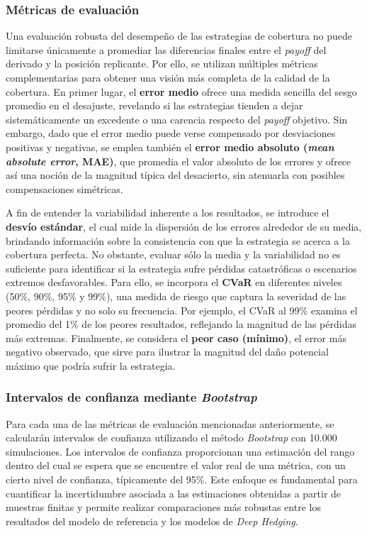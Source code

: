 \documentclass[11pt,a4paper,spanish]{article}
\numberwithin{equation}{section} %
\begin{document}
\subsubsection{Métricas de evaluación}

Una evaluación robusta del desempeño de las estrategias de cobertura no puede limitarse únicamente a promediar las diferencias finales entre el \textit{payoff} del derivado y la posición replicante. Por ello, se utilizan múltiples métricas complementarias para obtener una visión más completa de la calidad de la cobertura. En primer lugar, el \textbf{error medio} ofrece una medida sencilla del sesgo promedio en el desajuste, revelando si las estrategias tienden a dejar sistemáticamente un excedente o una carencia respecto del \textit{payoff} objetivo. Sin embargo, dado que el error medio puede verse compensado por desviaciones positivas y negativas, se emplea también el \textbf{error medio absoluto (\textit{mean absolute error}, MAE)}, que promedia el valor absoluto de los errores y ofrece así una noción de la magnitud típica del desacierto, sin atenuarla con posibles compensaciones simétricas.

A fin de entender la variabilidad inherente a los resultados, se introduce el \textbf{desvío estándar}, el cual mide la dispersión de los errores alrededor de su media, brindando información sobre la consistencia con que la estrategia se acerca a la cobertura perfecta. No obstante, evaluar sólo la media y la variabilidad no es suficiente para identificar si la estrategia sufre pérdidas catastróficas o escenarios extremos desfavorables. Para ello, se incorpora el \textbf{CVaR} en diferentes niveles (50\%, 90\%, 95\% y 99\%), una medida de riesgo que captura la severidad de las peores pérdidas y no solo su frecuencia. Por ejemplo, el CVaR al 99\% examina el promedio del 1\% de los peores resultados, reflejando la magnitud de las pérdidas más extremas. Finalmente, se considera el \textbf{peor caso (mínimo)}, el error más negativo observado, que sirve para ilustrar la magnitud del daño potencial máximo que podría sufrir la estrategia.



\subsubsection{Intervalos de confianza mediante \textit{Bootstrap}}

Para cada una de las métricas de evaluación mencionadas anteriormente, se calcularán intervalos de confianza utilizando el método \textit{Bootstrap} con 10.000 simulaciones. Los intervalos de confianza proporcionan una estimación del rango dentro del cual se espera que se encuentre el valor real de una métrica, con un cierto nivel de confianza, típicamente del 95\%. Este enfoque es fundamental para cuantificar la incertidumbre asociada a las estimaciones obtenidas a partir de muestras finitas y permite realizar comparaciones más robustas entre los resultados del modelo de referencia y los modelos de \textit{Deep Hedging}.
\end{document}
